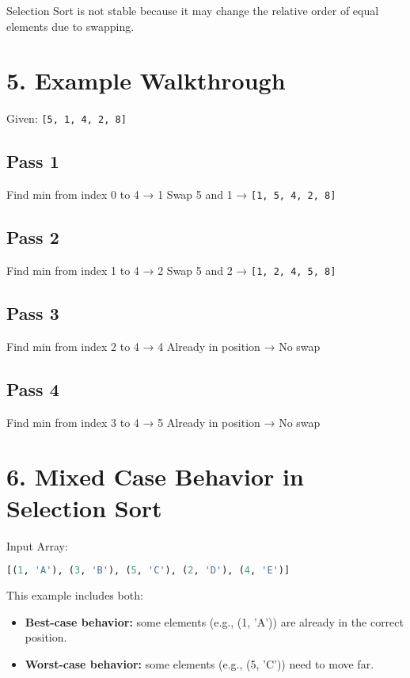 \documentclass[14pt]{extarticle}
\begin{document}
\begin{tcolorbox}[
  colback=white,
  colframe=black,
  title=Stability Note
]
Selection Sort is not stable because it may change the relative order of equal elements due to swapping.
\end{tcolorbox}

\section*{5. Example Walkthrough}

Given: \texttt{[5, 1, 4, 2, 8]}

\subsection*{Pass 1}
Find min from index 0 to 4 → 1  
Swap 5 and 1 → \texttt{[1, 5, 4, 2, 8]}

\subsection*{Pass 2}
Find min from index 1 to 4 → 2  
Swap 5 and 2 → \texttt{[1, 2, 4, 5, 8]}

\subsection*{Pass 3}
Find min from index 2 to 4 → 4  
Already in position → No swap

\subsection*{Pass 4}
Find min from index 3 to 4 → 5  
Already in position → No swap

\section*{6. Mixed Case Behavior in Selection Sort}

Input Array:
\begin{lstlisting}[language=Python]
[(1, 'A'), (3, 'B'), (5, 'C'), (2, 'D'), (4, 'E')]
\end{lstlisting}

This example includes both:
\begin{itemize}
    \item \textbf{Best-case behavior:} some elements (e.g., (1, 'A')) are already in the correct position.
    \item \textbf{Worst-case behavior:} some elements (e.g., (5, 'C')) need to move far.
\end{itemize}
\end{document}
